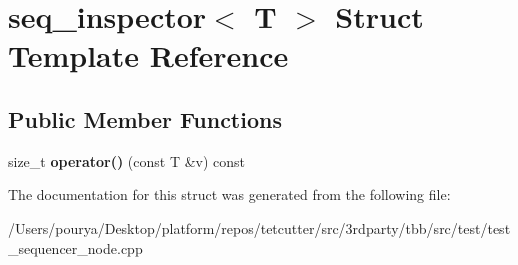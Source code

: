\hypertarget{structseq__inspector}{}\section{seq\+\_\+inspector$<$ T $>$ Struct Template Reference}
\label{structseq__inspector}
\subsection*{Public Member Functions}
\begin{DoxyCompactItemize}
\item 
\hypertarget{structseq__inspector_ad188b41bb587f682a12ebd2464040b8d}{}size\+\_\+t {\bfseries operator()} (const T \&v) const \label{structseq__inspector_ad188b41bb587f682a12ebd2464040b8d}

\end{DoxyCompactItemize}


The documentation for this struct was generated from the following file\+:\begin{DoxyCompactItemize}
\item 
/\+Users/pourya/\+Desktop/platform/repos/tetcutter/src/3rdparty/tbb/src/test/test\+\_\+sequencer\+\_\+node.\+cpp\end{DoxyCompactItemize}
